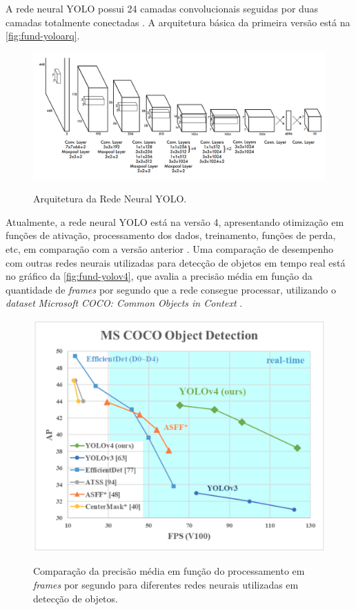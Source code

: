 A rede neural YOLO possui 24 camadas convolucionais seguidas por duas camadas totalmente conectadas \cite{ref:Yan}. A arquitetura básica da primeira versão está na \autoref{fig:fund-yoloarq}.

\begin{figure}[h!] %
  \centering
  \caption{Arquitetura da Rede Neural YOLO.}
  \includegraphics[scale=0.3]{img/img-fundamentacao-yoloarq.png}
  \label{fig:fund-yoloarq}
\end{figure}

Atualmente, a rede neural YOLO está na versão 4, apresentando otimização em funções de ativação, processamento dos dados, treinamento, funções de perda, etc, em comparação com a versão anterior \cite{ref:Wang-et-al}. Uma comparação de desempenho com outras redes neurais utilizadas para detecção de objetos em tempo real está no gráfico da \autoref{fig:fund-yolov4}, que avalia a precisão média em função da quantidade de \textit{frames} por segundo que a rede consegue processar, utilizando o \textit{dataset} \textit{Microsoft COCO:  Common Objects in Context} \cite{ref:Lin-et-al}.

\begin{figure}[h!] %
  \centering
  \caption{Comparação da precisão média em função do processamento em \textit{frames} por segundo para diferentes redes neurais utilizadas em detecção de objetos.}
  \includegraphics[scale=0.3]{img/img-fundamentacao-yolov4.png}
  \label{fig:fund-yolov4}
\end{figure}

